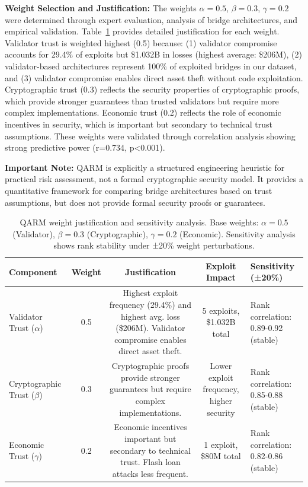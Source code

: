 \documentclass[runningheads]{llncs}
\begin{document}
\textbf{Weight Selection and Justification:} The weights $\alpha=0.5$, $\beta=0.3$, $\gamma=0.2$ were determined through expert evaluation, analysis of bridge architectures, and empirical validation. Table~\ref{tab:qarm_weight_justification} provides detailed justification for each weight. Validator trust is weighted highest (0.5) because: (1) validator compromise accounts for 29.4\% of exploits but \$1.032B in losses (highest average: \$206M), (2) validator-based architectures represent 100\% of exploited bridges in our dataset, and (3) validator compromise enables direct asset theft without code exploitation. Cryptographic trust (0.3) reflects the security properties of cryptographic proofs, which provide stronger guarantees than trusted validators but require more complex implementations. Economic trust (0.2) reflects the role of economic incentives in security, which is important but secondary to technical trust assumptions. These weights were validated through correlation analysis showing strong predictive power (r=0.734, p<0.001).

\textbf{Important Note:} QARM is explicitly a structured engineering heuristic for practical risk assessment, not a formal cryptographic security model. It provides a quantitative framework for comparing bridge architectures based on trust assumptions, but does not provide formal security proofs or guarantees.

\begin{table}[!ht]
    \centering
    \caption{QARM weight justification and sensitivity analysis. Base weights: $\alpha=0.5$ (Validator), $\beta=0.3$ (Cryptographic), $\gamma=0.2$ (Economic). Sensitivity analysis shows rank stability under ±20\% weight perturbations.}
    \label{tab:qarm_weight_justification}
    \begin{tabular}{lcccp{4cm}}
        \toprule
        \textbf{Component} & \textbf{Weight} & \textbf{Justification} & \textbf{Exploit Impact} & \textbf{Sensitivity (±20\%)} \\
        \midrule
        Validator Trust ($\alpha$) & 0.5 & Highest exploit frequency (29.4\%) and highest avg. loss (\$206M). Validator compromise enables direct asset theft. & 5 exploits, \$1.032B total & Rank correlation: 0.89-0.92 (stable) \\
        Cryptographic Trust ($\beta$) & 0.3 & Cryptographic proofs provide stronger guarantees but require complex implementations. & Lower exploit frequency, higher security & Rank correlation: 0.85-0.88 (stable) \\
        Economic Trust ($\gamma$) & 0.2 & Economic incentives important but secondary to technical trust. Flash loan attacks less frequent. & 1 exploit, \$80M total & Rank correlation: 0.82-0.86 (stable) \\
        \bottomrule
    \end{tabular}
\end{table}
\end{document}

